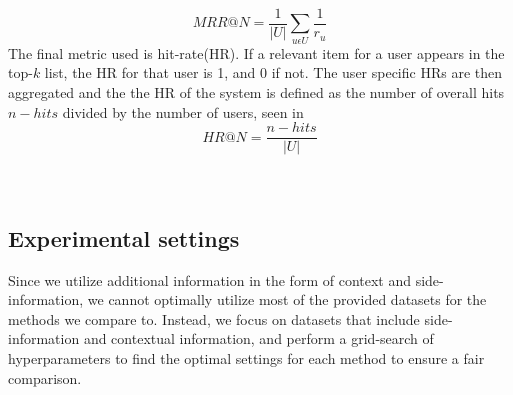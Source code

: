 \begin{equation}
    \label{eqn:mrr}
    MRR@N = \frac{1}{|U|} \sum\limits_{u \epsilon U}\frac{1}{r_u}
\end{equation}
The final metric used is hit-rate(HR).
If a relevant item for a user appears in the top-$k$ list, the HR for that user is 1, and 0 if not. The user specific HRs are then aggregated and the the HR of the system is defined as the number of overall hits $n-hits$ divided by the number of users, seen in  
\begin{equation}
    \label{eqn:hr}
    HR@N = \frac{n-hits}{|U|}
\end{equation}
\\\\

\subsection{Experimental settings}
Since we utilize additional information in the form of context and side-information, we cannot optimally utilize most of the provided datasets for the methods we compare to.
Instead, we focus on datasets that include side-information and contextual information, and perform a grid-search of hyperparameters to find the optimal settings for each method to ensure a fair comparison.

